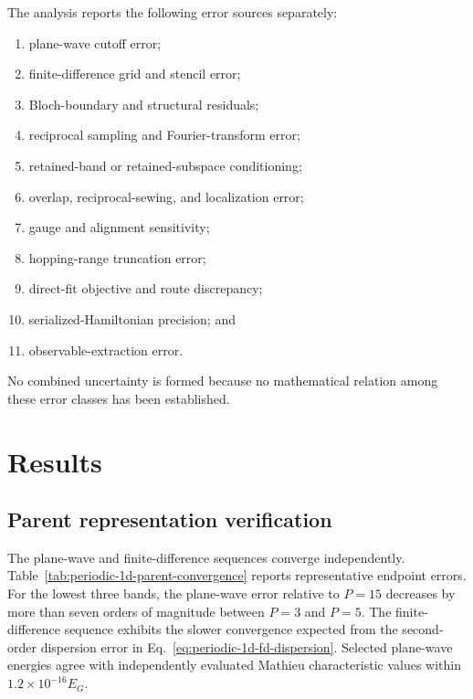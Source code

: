 The analysis reports the following error sources separately:
\begin{enumerate}
    \item plane-wave cutoff error;
    \item finite-difference grid and stencil error;
    \item Bloch-boundary and structural residuals;
    \item reciprocal sampling and Fourier-transform error;
    \item retained-band or retained-subspace conditioning;
    \item overlap, reciprocal-sewing, and localization error;
    \item gauge and alignment sensitivity;
    \item hopping-range truncation error;
    \item direct-fit objective and route discrepancy;
    \item serialized-Hamiltonian precision; and
    \item observable-extraction error.
\end{enumerate}
No combined uncertainty is formed because no mathematical relation among these
error classes has been established.

\section{Results}

\subsection{Parent representation verification}

The plane-wave and finite-difference sequences converge independently.
Table~\ref{tab:periodic-1d-parent-convergence} reports representative endpoint
errors. For the lowest three bands, the plane-wave error relative to $P=15$
decreases by more than seven orders of magnitude between $P=3$ and $P=5$. The
finite-difference sequence exhibits the slower convergence expected from the
second-order dispersion error in
Eq.~\eqref{eq:periodic-1d-fd-dispersion}. Selected plane-wave energies agree
with independently evaluated Mathieu characteristic values within
$1.2\times10^{-16}E_G$.


